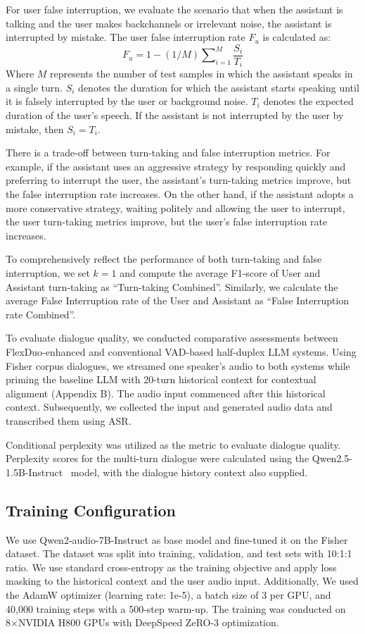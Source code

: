 \documentclass[11pt]{article}
\begin{document}
For user false interruption, we evaluate the scenario that when the assistant is talking and the user makes backchannels or irrelevant noise, the assistant is interrupted by mistake. The user false interruption rate $F_u$ is calculated as:
\begin{equation}
  \label{eq5}
F_u=1 - (1/M)\sum\nolimits_{i=1}^{M}\frac{S_i}{T_i}
\end{equation}
Where $M$ represents the number of test samples in which the assistant speaks in a single turn.
$S_i$ denotes the duration for which the assistant starts speaking until it is falsely interrupted by the user or background noise.
$T_i$ denotes the expected duration of the user's speech. 
If the assistant is not interrupted by the user by mistake, then $S_i=T_i$. 

There is a trade-off between turn-taking and false interruption metrics. For example, if the assistant uses an aggressive strategy by responding quickly and preferring to interrupt the user, the assistant's turn-taking metrics improve, but the false interruption rate increases. On the other hand, if the assistant adopts a more conservative strategy, waiting politely and allowing the user to interrupt, the user turn-taking metrics improve, but the user's false interruption rate increases.

To comprehensively reflect the performance of both turn-taking and false interruption, we set $k=1$ and compute the average F1-score of User and Assistant turn-taking as ``Turn-taking Combined''. Similarly, we calculate the average False Interruption rate of the User and Assistant as ``False Interruption rate Combined''.

To evaluate dialogue quality, we conducted comparative assessments between FlexDuo-enhanced and conventional VAD-based half-duplex LLM systems. Using Fisher corpus dialogues, we streamed one speaker’s audio to both systems while priming the baseline LLM with 20-turn historical context for contextual alignment (Appendix B).  The audio input commenced after this historical context. Subsequently, we collected the input and generated audio data and transcribed them using ASR.

Conditional perplexity was utilized as the metric to evaluate dialogue quality. Perplexity scores for the multi-turn dialogue were calculated using the Qwen2.5-1.5B-Instruct~\cite{yang2024qwen2} model, with the dialogue history context also supplied.


\subsection{Training Configuration}
We use Qwen2-audio-7B-Instruct as base model and fine-tuned it on the Fisher dataset. The dataset was split into training, validation, and test sets with 10:1:1 ratio. We use standard cross-entropy as the training objective and apply loss masking to the historical context and the user audio input. Additionally, We used the AdamW optimizer (learning rate: 1e-5), a batch size of 3 per GPU, and 40,000 training steps with a 500-step warm-up. The training was conducted on 8×NVIDIA H800 GPUs with DeepSpeed ZeRO-3 optimization.
\end{document}
